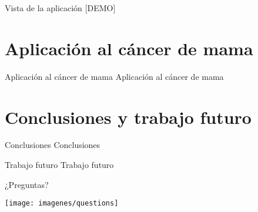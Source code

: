 \documentclass[hyperref={unicode}]{beamer}
\begin{document}
\begin{frame}{Vista de la aplicación}
	[DEMO]
\end{frame}

\section{Aplicación al cáncer de mama}
\begin{frame}{Aplicación al cáncer de mama}
	Aplicación al cáncer de mama
\end{frame}

\section{Conclusiones y trabajo futuro}
\begin{frame}{Conclusiones}
	Conclusiones
\end{frame}

\begin{frame}{Trabajo futuro}
	Trabajo futuro
\end{frame}

\begin{frame}{¿Preguntas?}
	
	{%
		\centering
		\texttt{[image: imagenes/questions]}
	}


\end{frame}
\end{document}
